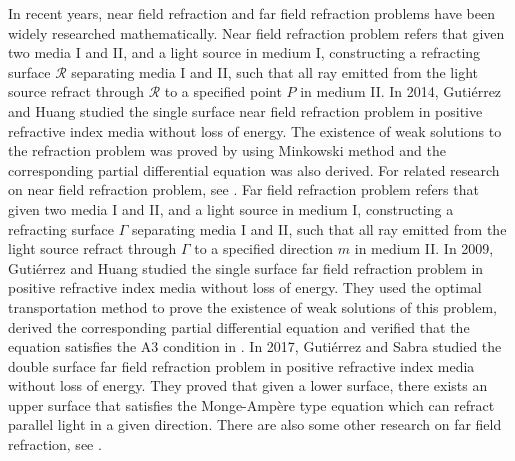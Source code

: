 \documentclass[a4paper,12pt,]{article}
\numberwithin{equation}{section}
\numberwithin{equation}{section} \allowdisplaybreaks
\begin{document}
In recent years, near field refraction and far field refraction problems have been widely researched mathematically. Near field refraction problem refers that given two media \textsc{I} and \textsc{II}, and a light source in medium \textsc{I}, constructing a refracting surface $\mathcal{R}$ separating media \textsc{I} and \textsc{II}, such that all ray emitted from the light source refract through $\mathcal{R}$ to a specified point $P$ in medium \textsc{II}. In 2014, Gutiérrez and Huang \cite{GH14} studied the single surface near field refraction problem in positive refractive index media without loss of energy. The existence of weak solutions to the refraction problem was proved by using Minkowski method and the corresponding partial differential equation was also derived. For related research on near field refraction problem, see \cite{GM21,GSA18, GT14, GT15, GT19}. Far field refraction problem refers that given two media \textsc{I} and \textsc{II}, and a light source in medium \textsc{I}, constructing a refracting surface $\Gamma$ separating media \textsc{I} and \textsc{II}, such that all ray emitted from the light source refract through $\Gamma$ to a specified direction $m$ in medium \textsc{II}. In 2009, Gutiérrez and Huang \cite{GH09} studied the single surface far field refraction problem in positive refractive index media without loss of energy. They used the optimal transportation method to prove the existence of weak solutions of this problem, derived the corresponding partial differential equation and verified that the equation satisfies the A3 condition in \cite{MTW05}. In 2017, Gutiérrez and Sabra \cite{GS18} studied the double surface far field refraction problem in positive refractive index media without loss of energy. They proved that given a lower surface, there exists an upper surface that satisfies the Monge-Amp\`ere type equation which can refract parallel light in a given direction. There are also some other research on far field refraction, see \cite{AF24,DG17,GH19,GT11}.
\end{document}
